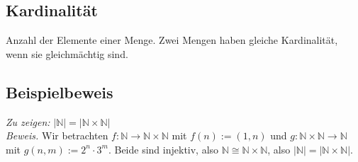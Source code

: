 \subsection*{Kardinalität}
Anzahl der Elemente einer Menge. Zwei Mengen haben gleiche Kardinalität, wenn
sie gleichmächtig sind.
\subsection*{Beispielbeweis}
\emph{Zu zeigen:} $|\mathbb{N}|=|\mathbb{N}\times\mathbb{N}|$\\
\emph{Beweis.} Wir betrachten $f:\mathbb{N}\to\mathbb{N}\times\mathbb{N}$ mit
$f(n):=(1,n)$ und $g:\mathbb{N}\times\mathbb{N}\to\mathbb{N}$ mit $g(n,m):=2^n\cdot 3^m$.
Beide sind injektiv, also $\mathbb{N}\cong\mathbb{N}\times\mathbb{N}$, also
$|\mathbb{N}|=|\mathbb{N}\times\mathbb{N}|$.